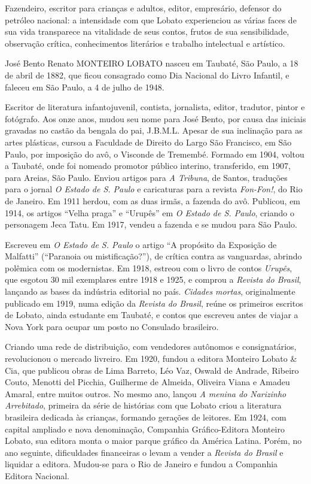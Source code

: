 \documentclass[12pt]{extarticle}
\begin{document}
Fazendeiro, escritor para crianças e adultos, editor, empresário,
defensor do petróleo nacional: a intensidade com que Lobato experienciou
as várias faces de sua vida transparece na vitalidade de seus contos,
frutos de sua sensibilidade, observação crítica, conhecimentos
literários e trabalho intelectual e artístico.

José Bento Renato MONTEIRO LOBATO nasceu em Taubaté, São Paulo, a 18 de
abril de 1882, que ficou consagrado como Dia Nacional do Livro Infantil,
e faleceu em São Paulo, a 4 de julho de 1948.

Escritor de literatura infantojuvenil, contista, jornalista, editor,
tradutor, pintor e fotógrafo. Aos onze anos, mudou seu nome para José
Bento, por causa das iniciais gravadas no castão da bengala do pai,
J.B.M.L. Apesar de sua inclinação para as artes plásticas, cursou a
Faculdade de Direito do Largo São Francisco, em São Paulo, por imposição
do avô, o Visconde de Tremembé. Formado em 1904, voltou a Taubaté, onde
foi nomeado promotor público interino, transferido, em 1907, para
Areias, São Paulo. Enviou artigos para \emph{A Tribuna}, de Santos,
traduções para o jornal \emph{O Estado de S. Paulo} e caricaturas para a
revista \emph{Fon-Fon!}, do Rio de Janeiro. Em 1911 herdou, com as duas
irmãs, a fazenda do avô. Publicou, em 1914, os artigos ``Velha praga'' e
``Urupês'' em \emph{O Estado de S. Paulo}, criando o personagem Jeca
Tatu. Em 1917, vendeu a fazenda e se mudou para São Paulo.

Escreveu em \emph{O Estado de S. Paulo} o artigo ``A propósito da
Exposição de Malfatti'' (``Paranoia ou mistificação?''), de crítica
contra as vanguardas, abrindo polêmica com os modernistas. Em 1918,
estreou com o livro de contos \emph{Urupês}, que esgotou 30 mil
exemplares entre 1918 e 1925, e comprou a \emph{Revista do Brasil},
lançando as bases da indústria editorial no país. \emph{Cidades mortas},
originalmente publicado em 1919, numa edição da \emph{Revista do
Brasil}, reúne os primeiros escritos de Lobato, ainda estudante em
Taubaté, e contos que escreveu antes de viajar a Nova York para ocupar
um posto no Consulado brasileiro.

Criando uma rede de distribuição, com vendedores autônomos e
consignatários, revolucionou o mercado livreiro. Em 1920, fundou a
editora Monteiro Lobato \& Cia, que publicou obras de Lima Barreto, Léo
Vaz, Oswald de Andrade, Ribeiro Couto, Menotti del Picchia, Guilherme de
Almeida, Oliveira Viana e Amadeu Amaral, entre muitos outros. No mesmo
ano, lançou \emph{A menina do Narizinho Arrebitado}, primeira da série
de histórias com que Lobato criou a literatura brasileira dedicada às
crianças, formando gerações de leitores. Em 1924, com capital ampliado e
nova denominação, Companhia Gráfico-Editora Monteiro Lobato, sua editora
monta o maior parque gráfico da América Latina. Porém, no ano seguinte,
dificuldades financeiras o levam a vender a \emph{Revista do Brasil} e
liquidar a editora. Mudou-se para o Rio de Janeiro e fundou a Companhia
Editora Nacional.
\end{document}
